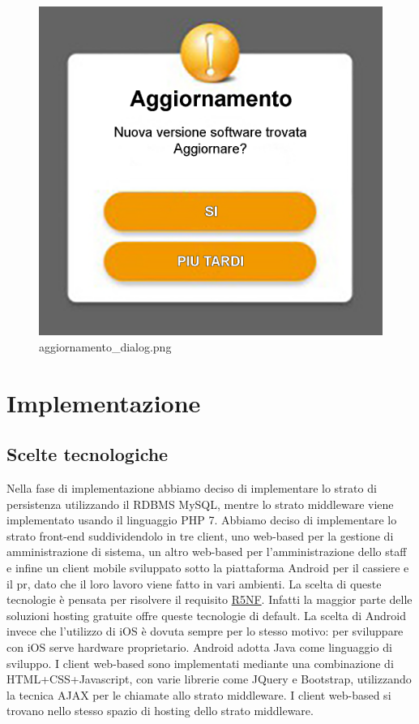 \documentclass[a4paper]{article}
\begin{document}
\begin{figure}[H]
    \includegraphics[scale=0.5]{Progettazione/aggiornamento_dialog.png}
    \centering
    \caption{aggiornamento\_dialog.png}
\end{figure}


\newpage

\section{Implementazione}

\subsection{Scelte tecnologiche}

Nella fase di implementazione abbiamo deciso di implementare lo strato di persistenza utilizzando il RDBMS MySQL, mentre lo strato middleware viene implementato usando il linguaggio PHP 7. Abbiamo deciso di implementare lo strato front-end suddividendolo in tre client, uno web-based per la gestione di amministrazione di sistema, un altro web-based per l'amministrazione dello staff e infine un client mobile sviluppato sotto la piattaforma Android per il cassiere e il pr, dato che il loro lavoro viene fatto in vari ambienti. La scelta di queste tecnologie è pensata per risolvere il requisito \hyperlink{R5NF}{R5NF}. Infatti la maggior parte delle soluzioni hosting gratuite offre queste tecnologie di default. La scelta di Android invece che l'utilizzo di iOS è dovuta sempre per lo stesso motivo: per sviluppare con iOS serve hardware proprietario. Android adotta Java come linguaggio di sviluppo. I client web-based sono implementati mediante una combinazione di HTML+CSS+Javascript, con varie librerie come JQuery e Bootstrap, utilizzando la tecnica AJAX per le chiamate allo strato middleware. I client web-based si trovano nello stesso spazio di hosting dello strato middleware.
\end{document}

